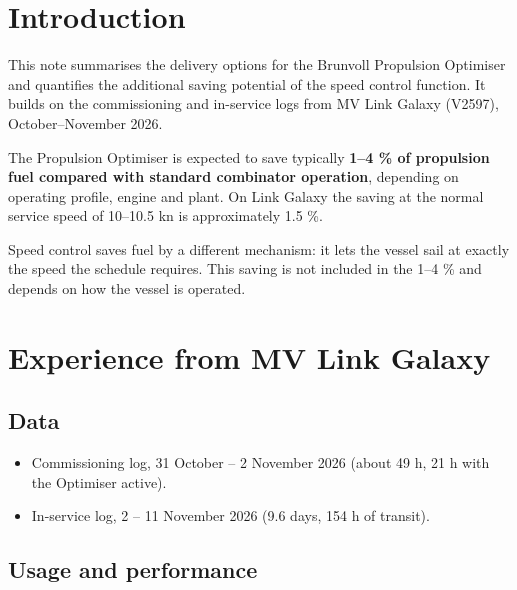 \documentclass[a4paper,11pt]{article}
\author{Frode Bloch}
\date{\today}
\title{}
\begin{document}
\bvMainTitlePage
\tableofcontents
\newpage

\section{Introduction}
\label{sec:org8f24d8f}

This note summarises the delivery options for the Brunvoll Propulsion
Optimiser and quantifies the additional saving potential of the speed
control function.  It builds on the commissioning and in-service logs
from MV Link Galaxy (V2597), October--November 2026.

The Propulsion Optimiser is expected to save typically \textbf{1--4 \% of
propulsion fuel compared with standard combinator operation}, depending
on operating profile, engine and plant.  On Link Galaxy the saving at
the normal service speed of 10--10.5 kn is approximately 1.5 \%.

Speed control saves fuel by a different mechanism: it lets the vessel
sail at exactly the speed the schedule requires.  This saving is not
included in the 1--4 \% and depends on how the vessel is operated.

\section{Experience from MV Link Galaxy}
\label{sec:org23bcf7e}

\subsection{Data}
\label{sec:org68fce23}

\begin{itemize}
\item Commissioning log, 31 October -- 2 November 2026 (about 49 h, 21 h
with the Optimiser active).
\item In-service log, 2 -- 11 November 2026 (9.6 days, 154 h of transit).
\end{itemize}

\subsection{Usage and performance}
\label{sec:org6abaef1}
\end{document}

